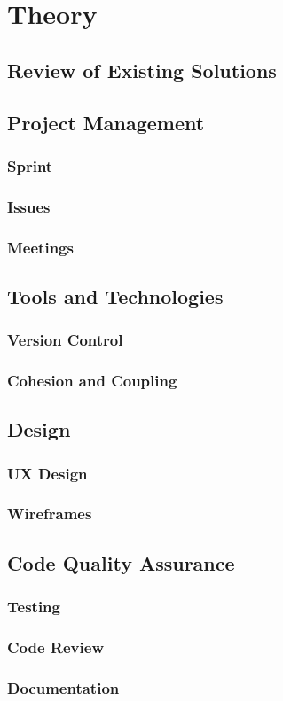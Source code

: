 \chapter{Theory}

\section{Review of Existing Solutions}

\section{Project Management}
\subsection{Sprint}
\subsection{Issues}
\subsection{Meetings}

\section{Tools and Technologies}
\subsection{Version Control}
\subsection{Cohesion and Coupling}

\section{Design}
\subsection{UX Design}
\subsection{Wireframes}

\section{Code Quality Assurance}
\subsection{Testing}
\subsection{Code Review}
\subsection{Documentation}